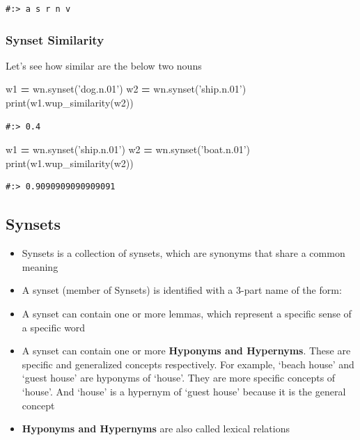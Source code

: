 \documentclass[
]{book}
\newenvironment{Shaded}{\begin{snugshade}}{\end{snugshade}}
\newcommand{\BuiltInTok}[1]{#1}
\newcommand{\NormalTok}[1]{#1}
\newcommand{\OperatorTok}[1]{\textcolor[rgb]{0.43,0.43,0.43}{\textbf{#1}}}
\newcommand{\StringTok}[1]{\textcolor[rgb]{0.5,0.5,0.5}{#1}}
\providecommand{\tightlist}{%
  \setlength{\itemsep}{0pt}\setlength{\parskip}{0pt}}
\begin{document}
\begin{verbatim}
#:> a s r n v
\end{verbatim}

\hypertarget{synset-similarity}{%
\subsubsection{Synset Similarity}\label{synset-similarity}}

Let's see how similar are the below two nouns

\begin{Shaded}
\begin{Highlighting}[]
\NormalTok{w1 }\OperatorTok{=}\NormalTok{ wn.synset(}\StringTok{'dog.n.01'}\NormalTok{)}
\NormalTok{w2 }\OperatorTok{=}\NormalTok{ wn.synset(}\StringTok{'ship.n.01'}\NormalTok{)}
\BuiltInTok{print}\NormalTok{(w1.wup_similarity(w2))}
\end{Highlighting}
\end{Shaded}

\begin{verbatim}
#:> 0.4
\end{verbatim}

\begin{Shaded}
\begin{Highlighting}[]
\NormalTok{w1 }\OperatorTok{=}\NormalTok{ wn.synset(}\StringTok{'ship.n.01'}\NormalTok{)}
\NormalTok{w2 }\OperatorTok{=}\NormalTok{ wn.synset(}\StringTok{'boat.n.01'}\NormalTok{)}
\BuiltInTok{print}\NormalTok{(w1.wup_similarity(w2))}
\end{Highlighting}
\end{Shaded}

\begin{verbatim}
#:> 0.9090909090909091
\end{verbatim}

\hypertarget{synsets}{%
\subsection{Synsets}\label{synsets}}

\begin{itemize}
\tightlist
\item
  Synsets is a collection of synsets, which are synonyms that share a common meaning\\
\item
  A synset (member of Synsets) is identified with a 3-part name of the form:
\item
  A synset can contain one or more lemmas, which represent a specific sense of a specific word\\
\item
  A synset can contain one or more \textbf{Hyponyms and Hypernyms}. These are specific and generalized concepts respectively. For example, `beach house' and `guest house' are hyponyms of `house'. They are more specific concepts of `house'. And `house' is a hypernym of `guest house' because it is the general concept\\
\item
  \textbf{Hyponyms and Hypernyms} are also called lexical relations
\end{itemize}
\end{document}
